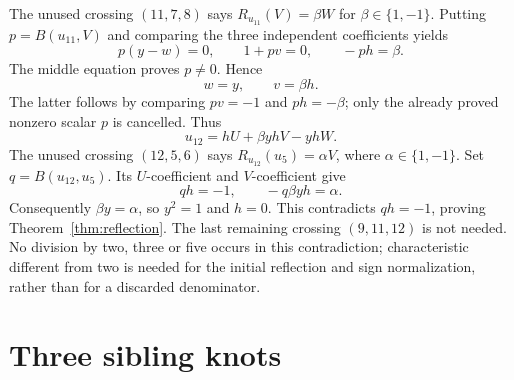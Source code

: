 \documentclass[11pt]{article}
\begin{document}
The unused crossing $(11,7,8)$ says
$R_{u_{11}}(V)=\beta W$ for $\beta\in\{1,-1\}$.
Putting $p=B(u_{11},V)$ and comparing the three independent
coefficients yields
\[
             p(y-w)=0,\qquad 1+pv=0,\qquad -ph=\beta.
\]
The middle equation proves $p\ne0$. Hence
\[
                              w=y,\qquad v=\beta h.
\]
The latter follows by comparing $pv=-1$ and $ph=-\beta$;
only the already proved nonzero scalar $p$ is cancelled.
Thus
\[
                         u_{12}=hU+\beta yhV-yhW.
\]
The unused crossing $(12,5,6)$ says
$R_{u_{12}}(u_5)=\alpha V$, where $\alpha\in\{1,-1\}$.
Set $q=B(u_{12},u_5)$. Its $U$-coefficient and $V$-coefficient give
\[
                         qh=-1,\qquad -q\beta yh=\alpha.
\]
Consequently $\beta y=\alpha$, so $y^2=1$ and $h=0$.
This contradicts $qh=-1$, proving Theorem~\ref{thm:reflection}.
The last remaining crossing $(9,11,12)$ is not needed.
No division by two, three or five occurs in this contradiction;
characteristic different from two is needed for the initial reflection
and sign normalization, rather than for a discarded denominator.

\section{Three sibling knots}
\end{document}

